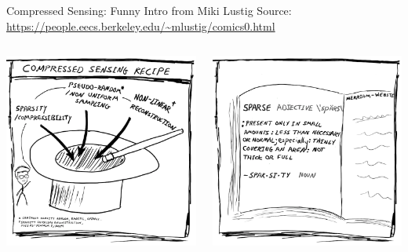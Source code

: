 \documentclass[aspectratio=169]{beamer}
\begin{document}
	\begin{frame}{Compressed Sensing: Funny Intro from Miki Lustig}
		Source: \url{https://people.eecs.berkeley.edu/~mlustig/comics0.html}
		\vspace{1em}
		\begin{columns}
			\centering
			\includegraphics[width=\columnwidth]{figures/cs-lustig-comics-05.png}
			
			\centering
			\includegraphics[width=\columnwidth]{figures/cs-lustig-comics-06.png}
		\end{columns}
	\end{frame}
	
\end{document}
